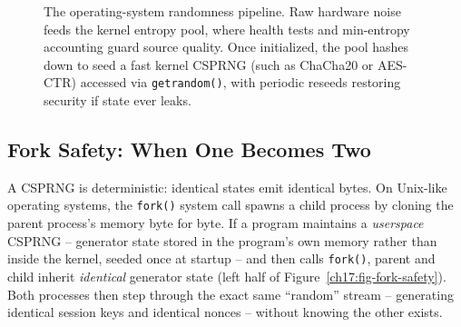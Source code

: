 \begin{figure}[htbp]
\caption{The operating-system randomness pipeline. Raw hardware noise feeds the kernel entropy pool, where health tests and min-entropy accounting guard source quality. Once initialized, the pool hashes down to seed a fast kernel CSPRNG (such as ChaCha20 or AES-CTR) accessed via \texttt{getrandom()}, with periodic reseeds restoring security if state ever leaks.}
\label{ch17:fig-arch}
\end{figure}

\subsection{Fork Safety: When One Becomes Two}
\label{ch17:fork}

A CSPRNG is deterministic: identical states emit identical bytes. On Unix-like operating systems, the \texttt{fork()} system call spawns a child process by cloning the parent process's memory byte for byte. If a program maintains a \emph{userspace} CSPRNG -- generator state stored in the program's own memory rather than inside the kernel, seeded once at startup -- and then calls \texttt{fork()}, parent and child inherit \emph{identical} generator state (left half of Figure~\ref{ch17:fig-fork-safety}). Both processes then step through the exact same ``random'' stream -- generating identical session keys and identical nonces -- without knowing the other exists.

